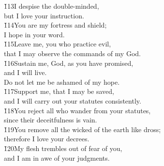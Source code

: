 \begin{poetry}
\poeml \v{113}I despise the double-minded, \\
\poemll    but I love your instruction. \\
\poeml \v{114}You are my fortress and shield; \\
\poemll    I hope in your word. \\
\poeml \v{115}Leave me, you who practice evil, \\
\poemll    that I may observe the commands of my God. \\
\poeml \v{116}Sustain me, God, as you have promised, \\
\poemll    and I will live. \\
\poemlll       Do not let me be ashamed of my hope. \\
\poeml \v{117}Support me, that I may be saved, \\
\poemll    and I will carry out your statutes consistently. \\
\poeml \v{118}You reject all who wander from your statutes, \\
\poemll    since their deceitfulness is vain. \\
\poeml \v{119}You remove all the wicked of the earth like dross; \\
\poemll    therefore I love your decrees. \\
\poeml \v{120}My flesh trembles out of fear of you, \\
\poemll    and I am in awe of your judgments.
\end{poetry}

